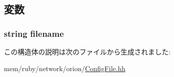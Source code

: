 \subsection{変数}
\hypertarget{structConfigFile_1_1file__not__found_a3a1a90139c2c8ab1fca0ea8b1790b7b2}{
\subsubsection[{filename}]{\setlength{\rightskip}{0pt plus 5cm}string {\bf filename}}}
\label{structConfigFile_1_1file__not__found_a3a1a90139c2c8ab1fca0ea8b1790b7b2}


この構造体の説明は次のファイルから生成されました:\begin{DoxyCompactItemize}
\item 
mem/ruby/network/orion/\hyperlink{ConfigFile_8hh}{ConfigFile.hh}\end{DoxyCompactItemize}
